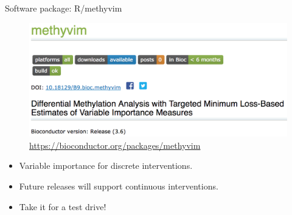 \documentclass[12pt,t,handout]{beamer}
\begin{document}
\begin{frame}[c]{Software package: R/methyvim}

\begin{figure}[H]
  \centering
  \includegraphics[width=\textwidth]{methyvim_bioc}
  \caption{
    \url{https://bioconductor.org/packages/methyvim}
  }
\end{figure}

\begin{center}
\begin{itemize}
  \itemsep4pt
  \item Variable importance for discrete interventions.
  \item Future releases will support continuous interventions.
  \item Take it for a test drive!
\end{itemize}
\end{center}


\end{frame}

\end{document}
